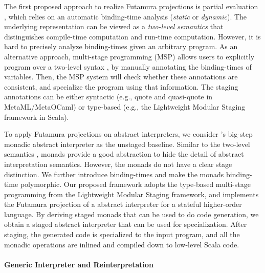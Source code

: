 The first proposed approach to realize Futamura projections is partial
evaluation \cite{DBLP:books/daglib/0072559}, which relies on an automatic
binding-time analysis (\textit{static} or \textit{dynamic}).  The underlying
representation can be viewed as a \textit{two-level semantics}
\cite{NIELSON1989117, NIELSON198859} that distinguishes compile-time
computation and run-time computation.
However, it is hard to precisely analyze binding-times given an arbitrary
program. As an alternative approach, multi-stage programming (MSP)
\cite{taha1999multi, DBLP:conf/pepm/TahaS97} allows users to explicitly program over
a two-level syntax \cite{Nielson:1992:TFL:130665}, by manually
annotating the binding-times of variables. Then, the MSP system
will check whether these annotations are consistent, and specialize the program
using that information. The staging annotations can be either syntactic (e.g.,
quote and quasi-quote in MetaML/MetaOCaml) or type-based (e.g., the Lightweight
Modular Staging framework \cite{DBLP:conf/gpce/RompfO10} in Scala).

To apply Futamura projections on abstract interpreters, we consider
\citet{DBLP:journals/pacmpl/DaraisLNH17}'s big-step monadic abstract
interpreter as the unstaged baseline.  Similar to the two-level semantics
\cite{NIELSON1989117}, monads provide a good abstraction to hide the detail of
abstract interpretation semantics. However, the monads do not have a clear
stage distinction.
We further introduce binding-times and make the monads binding-time polymorphic.
Our proposed framework adopts the type-based multi-stage programming from the
Lightweight Modular Staging framework, and implements the Futamura projection
of a abstract interpreter for a stateful higher-order
language. By deriving staged monads that can be used to do code generation, we
obtain a staged abstract interpreter that can be used for specialization. After
staging, the generated code is specialized to the input program, and all the
monadic operations are inlined and compiled down to low-level Scala code.

\paragraph{Generic Interpreter and Reinterpretation}

